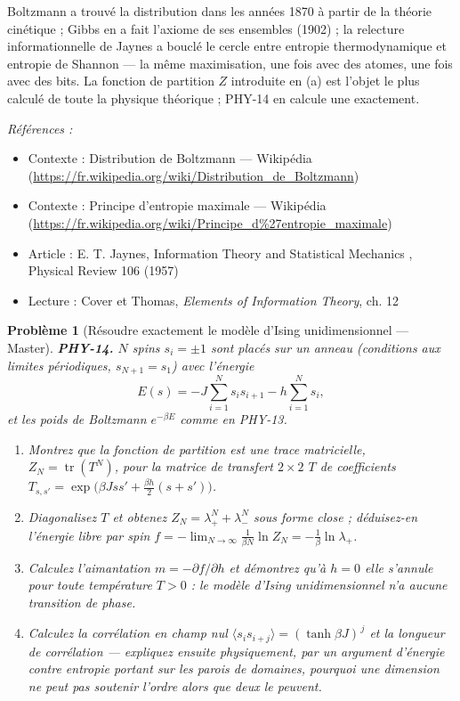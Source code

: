 \documentclass[11pt]{article}
\newtheorem{problem}{Problème}
\newenvironment{refs}{\par\small\noindent\emph{Références :}\begin{itemize}\setlength\itemsep{0pt}}{\end{itemize}\normalsize}
\begin{document}
\noindent Boltzmann a trouvé la distribution dans les années 1870 à partir de la théorie
cinétique ; Gibbs en a fait l'axiome de ses ensembles (1902) ; la relecture informationnelle de
Jaynes a bouclé le cercle entre entropie thermodynamique et entropie de Shannon --- la même
maximisation, une fois avec des atomes, une fois avec des bits. La fonction de partition $Z$
introduite en (a) est l'objet le plus calculé de toute la physique théorique ; PHY-14 en calcule
une exactement.

\begin{refs}
\item Contexte : Distribution de Boltzmann --- Wikipédia (\url{https://fr.wikipedia.org/wiki/Distribution_de_Boltzmann})
\item Contexte : Principe d'entropie maximale --- Wikipédia (\url{https://fr.wikipedia.org/wiki/Principe_d%27entropie_maximale})
\item Article : E. T. Jaynes, \og{} Information Theory and Statistical Mechanics \fg{}, Physical Review 106 (1957)
\item Lecture : Cover et Thomas, \textit{Elements of Information Theory}, ch. 12
\end{refs}

\bigskip

\begin{problem}[{Résoudre exactement le modèle d'Ising unidimensionnel --- Master}]
\textbf{PHY-14.} $N$ spins $s_i = \pm 1$ sont placés sur un anneau (conditions aux limites
périodiques, $s_{N+1} = s_1$) avec l'énergie
\[ E(s) = -J\sum_{i=1}^{N} s_i s_{i+1} - h\sum_{i=1}^{N} s_i, \]
et les poids de Boltzmann $e^{-\beta E}$ comme en PHY-13.
\begin{enumerate}
\item[(a)] Montrez que la fonction de partition est une trace matricielle,
$Z_N = \operatorname{tr}(T^N)$, pour la matrice de transfert $2 \times 2$ $T$ de
coefficients $T_{s,s'} = \exp\bigl(\beta J s s' + \tfrac{\beta h}{2}(s + s')\bigr)$.
\item[(b)] Diagonalisez $T$ et obtenez $Z_N = \lambda_+^N + \lambda_-^N$ sous forme close ;
déduisez-en l'énergie libre par spin
$f = -\lim_{N\to\infty} \frac{1}{\beta N} \ln Z_N = -\frac{1}{\beta}\ln \lambda_+$.
\item[(c)] Calculez l'aimantation $m = -\partial f/\partial h$ et démontrez qu'à $h = 0$ elle
s'annule pour toute température $T > 0$ : le modèle d'Ising unidimensionnel n'a
\textit{aucune} transition de phase.
\item[(d)] Calculez la corrélation en champ nul
$\langle s_i s_{i+j} \rangle = (\tanh \beta J)^{\,j}$ et la longueur de corrélation ---
expliquez ensuite physiquement, par un argument d'énergie contre entropie portant sur les parois
de domaines, pourquoi une dimension ne peut pas soutenir l'ordre alors que deux le peuvent.
\end{enumerate}

\end{problem}
\end{document}

